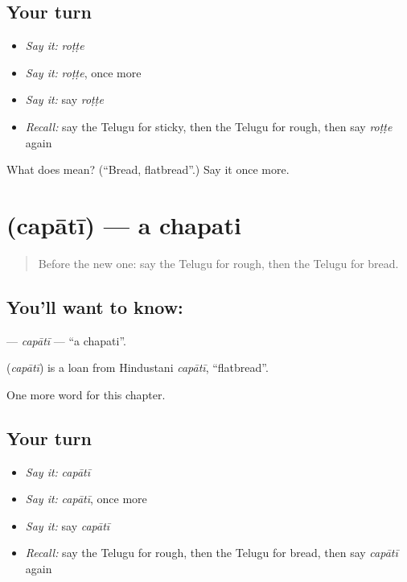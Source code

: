 \subsection*{Your turn}
\begin{itemize}
\raggedright
  \item \emph{Say it:} \emph{roṭṭe}
  \item \emph{Say it:} \emph{roṭṭe}, once more
  \item \emph{Say it:} say \emph{roṭṭe}
  \item \emph{Recall:} say the Telugu for sticky, then the Telugu for rough, then say \emph{roṭṭe} again
\end{itemize}

\begin{tcolorbox}[breakable,colback=teal!4,colframe=teal!35!black,title={Before you move on}]
What does  mean? (\textquotedblleft{}Bread, flatbread\textquotedblright{}.) Say it once more.
\end{tcolorbox}
\section[\texorpdfstring{\te{చపాతీ} (capātī)}{చపాతీ (capātī)}]{ (capātī) — a chapati}

\label{lesson:TE-C262-capati}



\begin{quote}
Before the new one: say the Telugu for rough, then the Telugu for bread.
\end{quote}

\subsection*{You'll want to know: }
\textbf{} — \emph{capātī} — \textquotedblleft{}a chapati\textquotedblright{}.

\begin{cousinweb}
\textbf{} (\emph{capātī}) is a loan from Hindustani \emph{capātī}, \textquotedblleft{}flatbread\textquotedblright{}.
\end{cousinweb}

\begin{grammarlens}[title={What you've built}]
One more word for this chapter.
\end{grammarlens}

\subsection*{Your turn}
\begin{itemize}
\raggedright
  \item \emph{Say it:} \emph{capātī}
  \item \emph{Say it:} \emph{capātī}, once more
  \item \emph{Say it:} say \emph{capātī}
  \item \emph{Recall:} say the Telugu for rough, then the Telugu for bread, then say \emph{capātī} again
\end{itemize}

